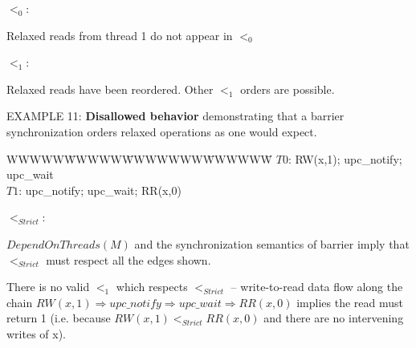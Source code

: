 \bigskip
$<_0$:\hspace{0.25in}
\hspace{0.6in}
\parbox[t]{2.5in}
{Relaxed reads from thread 1 do not appear in $<_0$}

\bigskip
$<_1$:\hspace{0.25in}
\hspace{0.25in}
\parbox[t]{2in}
{Relaxed reads have been reordered. Other $<_1$ orders are possible.}

\bigskip
\np EXAMPLE 11: \textbf{Disallowed behavior} 
demonstrating that a barrier synchronization 
orders relaxed operations as one would expect.

\begin{tabbing}WWWWW\=WWWWW\=WWWWWWW\=WWWWWW\=\kill
$T0$: \> RW(x,1); \> upc\_notify; \> upc\_wait\\
$T1$: \> \> upc\_notify; \> upc\_wait; \> RR(x,0)\\
\end{tabbing}

\bigskip
$<_{Strict}$:\\
\hspace{0.1in}
\parbox[t]{2.3in}
{$DependOnThreads(M)$ and the synchronization semantics of barrier imply
that $<_{Strict}$ must respect all the edges shown.\footnotemark}

\bigskip
There is no valid $<_1$ which respects $<_{Strict}$ -- write-to-read data flow
along the chain $RW(x,1) \Rightarrow upc\_notify \Rightarrow upc\_wait \Rightarrow RR(x,0)$
implies the read must return 1 (i.e. because $RW(x,1) <_{Strict} RR(x,0)$ and there are no 
intervening writes of x).

